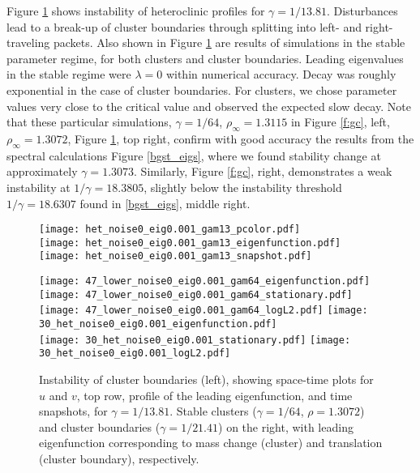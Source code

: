 \documentclass[10pt]{article}
\begin{document}
Figure \ref{f:hss} shows instability of heteroclinic profiles for $\gamma=1/13.81$. Disturbances lead to a break-up of cluster boundaries through splitting into left- and right-traveling packets. Also shown in Figure \ref{f:hss} are results of simulations in the stable parameter regime, for both clusters and cluster  boundaries. Leading eigenvalues in the stable regime were $\lambda=0$ within numerical accuracy. Decay was roughly exponential in the case of cluster boundaries. For clusters, we chose parameter values very close to the critical value and observed the expected slow decay. Note that these particular simulations, $\gamma=1/64$, $\rho_\infty=1.3115$ in Figure \ref{f:gc}, left,  $\rho_\infty=1.3072$, Figure \ref{f:hss}, top right, confirm with good accuracy the results from the spectral calculations Figure \ref{bgst_eigs}, where we found stability change at approximately $\gamma=1.3073$. Similarly, Figure \ref{f:gc}, right, demonstrates a weak instability at $1/\gamma=18.3805$, slightly below the instability threshold $1/\gamma=18.6307$ found in  \ref{bgst_eigs}, middle right.
\begin{figure}[h!]
\begin{minipage}{0.5\textwidth}
\texttt{[image: het\_noise0\_eig0.001\_gam13\_pcolor.pdf]}\\[0.2in]
\texttt{[image: het\_noise0\_eig0.001\_gam13\_eigenfunction.pdf]}\\[0.2in]
\texttt{[image: het\_noise0\_eig0.001\_gam13\_snapshot.pdf]}
\end{minipage}\hfill 
\begin{minipage}{0.48\textwidth}
\texttt{[image: 47\_lower\_noise0\_eig0.001\_gam64\_eigenfunction.pdf]}\\
\texttt{[image: 47\_lower\_noise0\_eig0.001\_gam64\_stationary.pdf]}
\texttt{[image: 47\_lower\_noise0\_eig0.001\_gam64\_logL2.pdf]}
\texttt{[image: 30\_het\_noise0\_eig0.001\_eigenfunction.pdf]}\\
\texttt{[image: 30\_het\_noise0\_eig0.001\_stationary.pdf]}
\texttt{[image: 30\_het\_noise0\_eig0.001\_logL2.pdf]}
\end{minipage}

\caption{Instability of cluster boundaries (left), showing space-time plots for $u$ and $v$, top row, profile of the leading eigenfunction, and time snapshots, for $\gamma = 1/13.81$. Stable clusters ($\gamma=1/64$, $\rho=1.3072$) and cluster  boundaries ($\gamma=1/21.41$) on the right, with leading eigenfunction corresponding to mass change (cluster) and translation (cluster boundary), respectively. }\label{f:hss}
\end{figure}
\end{document}
